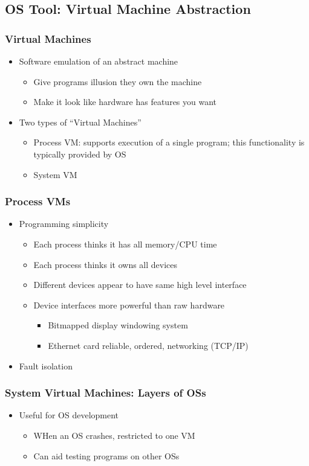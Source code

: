\documentclass{article}
\begin{document}
\subsection{OS Tool: Virtual Machine Abstraction}
\subsubsection{Virtual Machines}
\begin{itemize}
\item Software emulation of an abstract machine
\begin{itemize}
\item Give programs illusion they own the machine
\item Make it look like hardware has features you want
\end{itemize}
\item Two types of ``Virtual Machines''
\begin{itemize}
\item Process VM: supports execution of a single program; this functionality is typically provided by OS
\item System VM
\end{itemize}
\end{itemize}
\subsubsection{Process VMs}
\begin{itemize}
\item Programming simplicity
\begin{itemize}
\item Each process thinks it has all memory/CPU time
\item Each process thinks it owns all devices
\item Different devices appear to have same high level interface
\item Device interfaces more powerful than raw hardware
\begin{itemize}
\item Bitmapped display \textrightarrow windowing system
\item Ethernet card \textrightarrow reliable, ordered, networking (TCP/IP)
\end{itemize}
\end{itemize}
\item Fault isolation
\end{itemize}
\subsubsection{System Virtual Machines: Layers of OSs}
\begin{itemize}
\item Useful for OS development
\begin{itemize}
\item WHen an OS crashes, restricted to one VM
\item Can aid testing programs on other OSs
\end{itemize}
\end{itemize}
\end{document}
